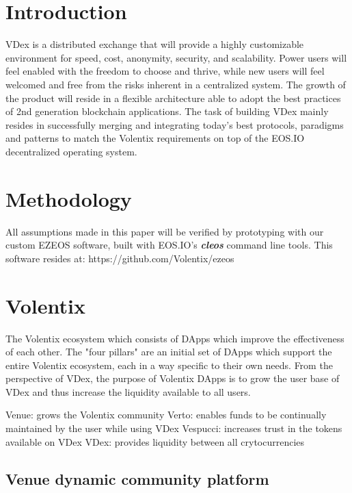 \documentclass[]{article}
\begin{document}
\section{Introduction}

VDex is a distributed exchange that will provide a highly customizable environment for speed, cost, 
anonymity, security, and scalability. 
Power users will feel enabled with the freedom to choose and thrive, 
while new users will feel welcomed and free from the risks inherent in a centralized system. 
The growth of the product will reside in a flexible architecture 
able to adopt the best practices of 2nd generation blockchain applications.  
The task of building VDex mainly resides in successfully merging
and integrating today's best protocols, paradigms and patterns to match the 
Volentix requirements on top of the EOS.IO decentralized operating system.
%
 	
\section{Methodology}

All assumptions made in this paper will be verified by prototyping with our custom EZEOS software, built
with EOS.IO's \textbf{\textit{cleos}} command line tools. This software resides at: https://github.com/Volentix/ezeos

\section{Volentix}	
The Volentix ecosystem which consists of DApps which improve the effectiveness of each other.
The "four pillars" are an initial set of DApps which support the entire Volentix ecosystem,
each in a way specific to their own needs.
From the perspective of VDex, the purpose of Volentix DApps is to grow the user base of VDex
and thus increase the liquidity available to all users.

Venue: grows the Volentix community
Verto: enables funds to be continually maintained by the user while using VDex
Vespucci: increases trust in the tokens available on VDex
VDex: provides liquidity between all crytocurrencies

\subsection {Venue dynamic community platform}
\end{document}
